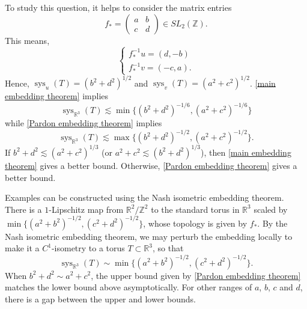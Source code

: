 \documentclass[12pt]{amsart}
\DeclareMathOperator*{\sys}{sys}
\theoremstyle{definition}
\begin{document}
To study this question, it helps to consider the matrix entries $$f_*=\begin{pmatrix}
a & b\\
c& d
\end{pmatrix}\in SL_2(\mathbb{Z}).$$ This means, \begin{equation*}
\begin{cases} f_*^{-1}u=(d,-b)\\
f_*^{-1}v=(-c,a).
\end{cases}
\end{equation*}
Hence, $\sys_u(T)=(b^2+d^2)^{1/2}$ and $\sys_v(T)=(a^2+c^2)^{1/2}$. \cref{main embedding theorem} implies $$\textstyle\sys_{\mathbb{R}^3}(T)\lesssim \min\{(b^2+d^2)^{-1/6},(a^2+c^2)^{-1/6}\}$$ while \cref{Pardon embedding theorem} implies $$\textstyle\sys_{\mathbb{R}^3}(T)\lesssim \max\{(b^2+d^2)^{-1/2},(a^2+c^2)^{-1/2}\}.$$ If $b^2+d^2\lesssim (a^2+c^2)^{1/3}$ (or $a^2+c^2\lesssim (b^2+d^2)^{1/3}$), then \cref{main embedding theorem} gives a better bound. Otherwise, \cref{Pardon embedding theorem} gives a better bound.   

Examples can be constructed using the Nash isometric embedding theorem. There is a $1$-Lipschitz map from $\mathbb{R}^2/\mathbb{Z}^2$ to the standard torus in $\mathbb{R}^3$ scaled by $\min\{(a^2+b^2)^{-1/2},(c^2+d^2)^{-1/2}\}$, whose topology is given by $f_*$. By the Nash isometric embedding theorem, we may perturb the embedding locally to make it a $C^1$-isometry to a torus $T\subset \mathbb{R}^3$, so that $$\textstyle\sys_{\mathbb{R}^3}(T)\sim \min\{(a^2+b^2)^{-1/2},(c^2+d^2)^{-1/2}\}.$$ When $b^2+d^2\sim a^2+c^2$, the upper bound given by \cref{Pardon embedding theorem} matches the lower bound above asymptotically. For other ranges of $a$, $b$, $c$ and $d$, there is a gap between the upper and lower bounds. 

 


\end{document}
